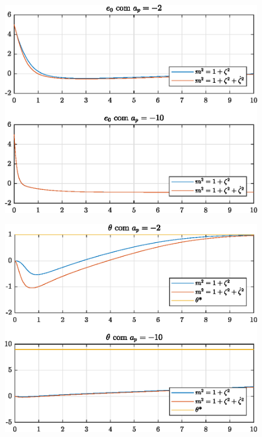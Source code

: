 \begin{figure}[H]
  \centering
  \includegraphics[width=12cm]{figs/e0/ap-2ap-10.eps}
\end{figure}
 
\begin{figure}[H]
  \centering
  \includegraphics[width=12cm]{figs/theta/ap-2ap-10.eps} 
\end{figure}

